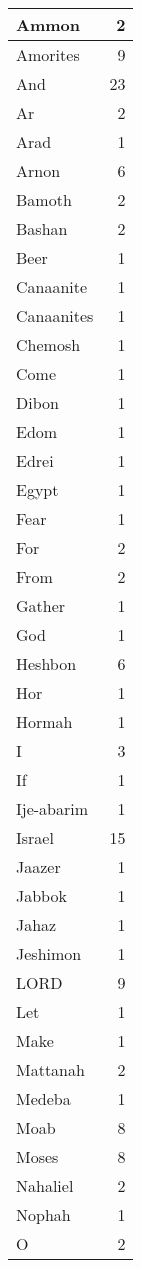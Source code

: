 \begin{center}
\begin{longtable}{l|r}
\hline \hline
\endlastfoot
Ammon & 2 \\ \hline
Amorites & 9 \\ \hline
And & 23 \\ \hline
Ar & 2 \\ \hline
Arad & 1 \\ \hline
Arnon & 6 \\ \hline
Bamoth & 2 \\ \hline
Bashan & 2 \\ \hline
Beer & 1 \\ \hline
Canaanite & 1 \\ \hline
Canaanites & 1 \\ \hline
Chemosh & 1 \\ \hline
Come & 1 \\ \hline
Dibon & 1 \\ \hline
Edom & 1 \\ \hline
Edrei & 1 \\ \hline
Egypt & 1 \\ \hline
Fear & 1 \\ \hline
For & 2 \\ \hline
From & 2 \\ \hline
Gather & 1 \\ \hline
God & 1 \\ \hline
Heshbon & 6 \\ \hline
Hor & 1 \\ \hline
Hormah & 1 \\ \hline
I & 3 \\ \hline
If & 1 \\ \hline
Ije-abarim & 1 \\ \hline
Israel & 15 \\ \hline
Jaazer & 1 \\ \hline
Jabbok & 1 \\ \hline
Jahaz & 1 \\ \hline
Jeshimon & 1 \\ \hline
LORD & 9 \\ \hline
Let & 1 \\ \hline
Make & 1 \\ \hline
Mattanah & 2 \\ \hline
Medeba & 1 \\ \hline
Moab & 8 \\ \hline
Moses & 8 \\ \hline
Nahaliel & 2 \\ \hline
Nophah & 1 \\ \hline
O & 2 \\ \hline

\end{longtable}
\end{center}
